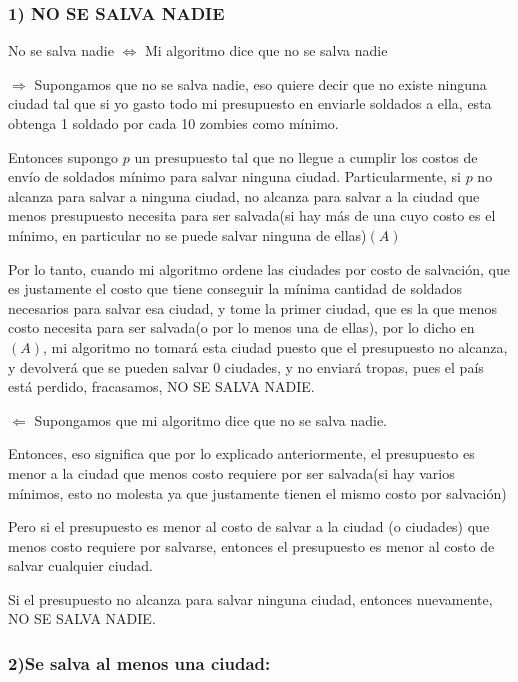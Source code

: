 \subsubsection{1) NO SE SALVA NADIE}

No se salva nadie $\Longleftrightarrow$ Mi algoritmo dice que no se salva nadie

$\Longrightarrow$ Supongamos que no se salva nadie, eso quiere decir que no existe ninguna ciudad tal que si yo gasto todo mi presupuesto en enviarle soldados a ella, esta obtenga 1 soldado por cada 10 zombies como mínimo.

Entonces supongo $p$ un presupuesto tal que no llegue a cumplir los costos de envío de soldados mínimo para salvar ninguna ciudad.
Particularmente, si $p$ no alcanza para salvar a ninguna ciudad, no alcanza para salvar a la ciudad que menos presupuesto necesita para ser salvada(si hay más de una cuyo costo es el mínimo, en particular no se puede salvar ninguna de ellas)$(A)$

Por lo tanto, cuando mi algoritmo ordene las ciudades por costo de salvación, que es justamente el costo que tiene conseguir la mínima cantidad de soldados necesarios para salvar esa ciudad, y tome la primer ciudad, que es la que menos costo necesita para ser salvada(o por lo menos una de ellas), por lo dicho en $(A)$, mi algoritmo no tomará esta ciudad puesto que el presupuesto no alcanza, y devolverá que se pueden salvar 0 ciudades, y no enviará tropas, pues el país está perdido, fracasamos, NO SE SALVA NADIE.

$\Longleftarrow$ Supongamos que mi algoritmo dice que no se salva nadie.

Entonces, eso significa que por lo explicado anteriormente, el presupuesto es menor a la ciudad que menos costo requiere por ser salvada(si hay varios mínimos, esto no molesta ya que justamente tienen el mismo costo por salvación)

Pero si el presupuesto es menor al costo de salvar a la ciudad (o ciudades) que menos costo requiere por salvarse, entonces el presupuesto es menor al costo de salvar cualquier ciudad.

Si el presupuesto no alcanza para salvar ninguna ciudad, entonces nuevamente, NO SE SALVA NADIE.

\subsubsection{2)Se salva al menos una ciudad:}

